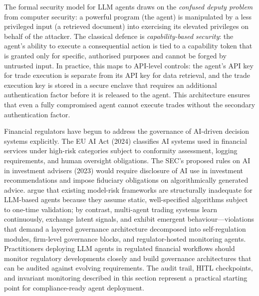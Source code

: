 \begin{context}
The formal security model for LLM agents draws on the \emph{confused deputy problem}
from computer security: a powerful program (the agent) is manipulated by a less
privileged input (a retrieved document) into exercising its elevated privileges on
behalf of the attacker. The classical defence is \emph{capability-based security}:
the agent's ability to execute a consequential action is tied to a capability token
that is granted only for specific, authorised purposes and cannot be forged by
untrusted input. In practice, this maps to API-level controls: the agent's API key
for trade execution is separate from its API key for data retrieval, and the trade
execution key is stored in a secure enclave that requires an additional authentication
factor before it is released to the agent. This architecture ensures that even a
fully compromised agent cannot execute trades without the secondary authentication
factor.

\begin{remark}
\label{rem:regulatory}
Financial regulators have begun to address the governance of AI-driven decision systems
explicitly. The EU AI Act (2024) classifies AI systems used in financial services under
high-risk categories subject to conformity assessment, logging requirements, and human
oversight obligations. The SEC's proposed rules on AI in investment advisers (2023)
would require disclosure of AI use in investment recommendations and impose fiduciary
obligations on algorithmically generated advice. \citet{kurshan2024agenticregulator}
argue that existing model-risk frameworks are structurally inadequate for LLM-based
agents because they assume static, well-specified algorithms subject to one-time
validation; by contrast, multi-agent trading systems learn continuously, exchange
latent signals, and exhibit emergent behaviour---violations that demand a layered
governance architecture decomposed into self-regulation modules, firm-level governance
blocks, and regulator-hosted monitoring agents. Practitioners deploying LLM agents
in regulated financial workflows should monitor regulatory developments closely and
build governance architectures that can be audited against evolving requirements. The
audit trail, HITL checkpoints, and invariant monitoring described in this section
represent a practical starting point for compliance-ready agent deployment.
\end{remark}


\end{context}
